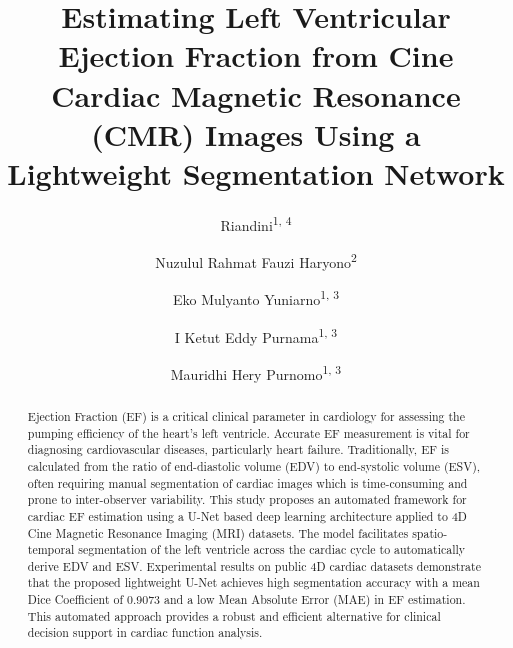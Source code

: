 \documentclass[final,3p,times,twocolumn]{elsarticle}
\begin{document}
\begin{frontmatter}
\title{Estimating Left Ventricular Ejection Fraction from Cine Cardiac Magnetic Resonance (CMR) Images Using a Lightweight Segmentation Network}
\author{Riandini\textsuperscript{1, 4}}

\author{Nuzulul Rahmat Fauzi Haryono\textsuperscript{2}}

\author{Eko Mulyanto Yuniarno\textsuperscript{1, 3}}

\author{I Ketut Eddy Purnama\textsuperscript{1, 3}}

\author{Mauridhi Hery Purnomo\textsuperscript{1, 3}}

\address{\textsuperscript{1}Department of Electrical Engineering, Institut Teknologi Sepuluh Nopember, Surabaya 60111, Indonesia\\
\textsuperscript{2}Klik Labs, Klik Digital Sinergi, Jakarta, Indonesia\\
\textsuperscript{3}Department of Computer Engineering, Institut Teknologi Sepuluh Nopember, Surabaya 60111, Indonesia\\
\textsuperscript{4}Department of Electrical Engineering, Politeknik Negeri Jakarta, Depok 16425, Indonesia\\

}

\begin{abstract}
Ejection Fraction (EF) is a critical clinical parameter in cardiology for assessing the pumping efficiency of the heart's left ventricle. Accurate EF measurement is vital for diagnosing cardiovascular diseases, particularly heart failure. Traditionally, EF is calculated from the ratio of end-diastolic volume (EDV) to end-systolic volume (ESV), often requiring manual segmentation of cardiac images which is time-consuming and prone to inter-observer variability. This study proposes an automated framework for cardiac EF estimation using a U-Net based deep learning architecture applied to 4D Cine Magnetic Resonance Imaging (MRI) datasets. The model facilitates spatio-temporal segmentation of the left ventricle across the cardiac cycle to automatically derive EDV and ESV. Experimental results on public 4D cardiac datasets demonstrate that the proposed lightweight U-Net achieves high segmentation accuracy with a mean Dice Coefficient of 0.9073 and a low Mean Absolute Error (MAE) in EF estimation. This automated approach provides a robust and efficient alternative for clinical decision support in cardiac function analysis.
\end{abstract}


\end{frontmatter}
\end{document}
